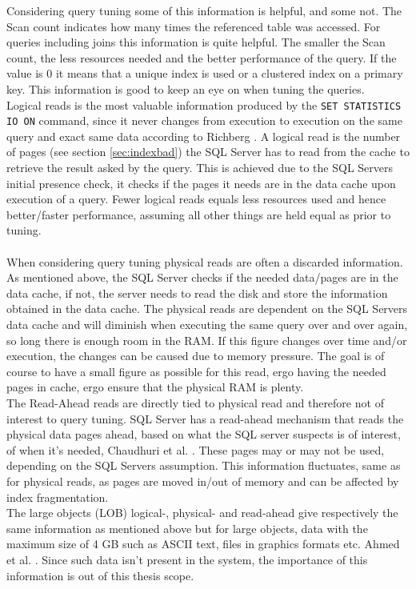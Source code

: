 \documentclass{cslthse-msc}
\begin{document}
Considering query tuning some of this information is helpful, and some not. The Scan count indicates how many times the referenced table was accessed. For queries including joins this information is quite helpful. The smaller the Scan count, the less resources needed and the better performance of the query. If the value is 0 it means that a unique index is used or a clustered index on a primary key. This information is good to keep an eye on when tuning the queries.\\ Logical reads is the most valuable information produced by the \texttt{SET STATISTICS IO ON} command, since it never changes from execution to execution on the same query and exact same data according to Richberg \cite{IO}. A logical read is the number of pages (see section \ref{sec:indexbad}) the SQL Server has to read from the cache to retrieve the result asked by the query. This is achieved due to the SQL Servers initial presence check, it checks if the pages it needs are in the data cache upon execution of a query. Fewer logical reads equals less resources used and hence better/faster performance, assuming all other things are held equal as prior to tuning.\\\\ When considering query tuning physical reads are often a discarded information. As mentioned above, the SQL Server checks if the needed data/pages are in the data cache, if not, the server needs to read the disk and store the information obtained in the data cache. The physical reads are dependent on the SQL Servers data cache and will diminish when executing the same query over and over again, so long there is enough room in the RAM. If this figure changes over time and/or execution, the changes can be caused due to memory pressure. The goal is of course to have a small figure as possible for this read, ergo having the needed pages in cache, ergo ensure that the physical RAM is plenty.\\ The Read-Ahead reads are directly tied to physical read and therefore not of interest to query tuning. SQL Server has a read-ahead mechanism that reads the physical data pages ahead, based on what the SQL server suspects is of interest, of when it's needed, Chaudhuri et al. \cite{readahead}. These pages may or may not be used, depending on the SQL Servers assumption. This information fluctuates, same as for physical reads, as pages are moved in/out of memory and can be affected by index fragmentation.\\ The large objects (LOB) logical-, physical- and read-ahead give respectively the same information as mentioned above but for large objects, data with the maximum size of 4 GB such as ASCII text, files in graphics formats etc. Ahmed et al. \cite{LOB}.  Since such data isn't present in the system, the importance of this information is out of this thesis scope.\\\\
\end{document}
